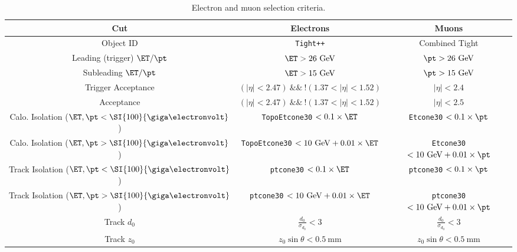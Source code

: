 \begin{table}[h]
	\centering
	\scriptsize
	\begin{tabular}{ccc}
		Cut & Electrons & Muons \\
		\hline
		Object ID & \texttt{Tight++} & Combined Tight \\
		Leading (trigger) $\ET/\pt$ & $\ET>26~\mbox{GeV}$ & $\pt>26~\mbox{GeV}$ \\
		Subleading $\ET/\pt$ & $\ET>15~\mbox{GeV}$ & $\pt>15~\mbox{GeV}$ \\
		Trigger Acceptance & $(|\eta|<2.47)\ \&\&\ !(1.37<|\eta|<1.52)$ & $|\eta|<2.4$ \\
		Acceptance & $(|\eta|<2.47)\ \&\&\ !(1.37<|\eta|<1.52)$ & $|\eta|<2.5$ \\
		Calo. Isolation ($\ET,\pt<\SI{100}{\giga\electronvolt}$) & \verb.TopoEtcone30. $<0.1\times \ET$  & \verb.Etcone30. $<0.1\times \pt$ \\
		Calo. Isolation ($\ET,\pt>\SI{100}{\giga\electronvolt}$) & \verb.TopoEtcone30. $<10~\mbox{GeV}+0.01\times \ET$ & \verb.Etcone30. $<10~\mbox{GeV}+0.01\times \pt $ \\
		Track Isolation ($\ET,\pt<\SI{100}{\giga\electronvolt}$) & \verb.ptcone30. $< 0.1\times \ET $ & \verb.ptcone30. $<0.1\times \pt$ \\
		Track Isolation ($\ET,\pt>\SI{100}{\giga\electronvolt}$) & \verb.ptcone30. $<10~\mbox{GeV}+0.01\times \ET$ & \verb.ptcone30. $<10~\mbox{GeV}+0.01\times \pt $ \\
		Track $d_0$ & $\frac{d_0}{\sigma_{d_0}}<3$  & $\frac{d_0}{\sigma_{d_0}}<3$  \\
		Track $z_0$ & $z_0\sin\theta<0.5~\mbox{mm}$ & $z_0\sin\theta<0.5~\mbox{mm}$  \\
	\end{tabular}
	\caption{Electron and muon selection criteria.}
	\label{table:electron-muon-selections}
\end{table}


